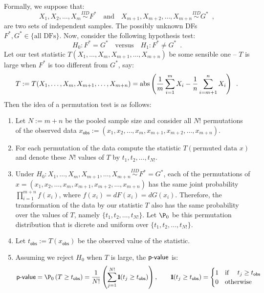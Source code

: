Formally, we suppose that:
\[
X_1,X_2,\ldots,X_m \overset{IID}{\sim} F^* \quad \text{and} \quad X_{m+1}, X_{m+2},\ldots,X_{m+n} \overset{IID}{\sim} G^* \enspace ,
\]
are two sets of independent samples.  The possibly unknown DFs $F^*,G^* \in \{ \text{all DFs} \}$.  Now, consider the following hypothesis test:
\[
H_0: F^*=G^* \quad \text{versus} \quad H_1: F^* \neq G^* \enspace .
\]
Let our test statistic $T(X_1,\ldots,X_m,X_{m+1},\ldots,X_{m+n})$ be some sensible one -- $T$ is large when $F^*$ is too different from $G^*$, say:
\[
T:=T(X_1,\ldots,X_m,X_{m+1},\ldots,X_{m+n})= \operatorname{abs} \left( \frac{1}{m} \sum_{i=1}^m X_i -  \frac{1}{n} \sum_{i=m+1}^n X_i  \right) \enspace .
\]
Then the idea of a permutation test is as follows:
\begin{enumerate}
\item Let $N:=m+n$ be the pooled sample size and consider all $N!$ permutations of the observed data $x_{\mathsf{obs}}:=(x_1,x_2,\ldots,x_m,x_{m+1},x_{m+2},\ldots,x_{m+n})$.
\item For each permutation of the data compute the statistic $T(\text{permuted data $x$})$ and denote these $N!$ values of $T$ by $t_1,t_2,\ldots,t_{N!}$.
\item Under $H_0: X_1,\ldots,X_m,X_{m+1},\ldots,X_{m+n} \overset{IID}{\sim}F^*=G^*$, each of the permutations of $x= (x_1,x_2,\ldots,x_m,x_{m+1},x_{m+2},\ldots,x_{m+n})$ has the same joint probability $\prod_{i=1}^{m+n} f(x_i)$, where $f(x_i)=dF(x_i)=dG(x_i)$.  Therefore, the transformation of the data by our statistic $T$ also has the same probability over the values of $T$, namely $\{t_1,t_2,\ldots,t_{N!}\}$.  Let $\P_0$ be this permutation distribution that is dicrete and uniform over  $\{t_1,t_2,\ldots,t_{N!}\}$.
\item Let $t_{\mathsf{obs}} := T(x_{\mathsf{obs}})$ be the observed value of the statistic.
\item Assuming we reject $H_0$ when $T$ is large, the $\mbox{\sf{p-value}}$ is:
\[
\pvalue = \P_0 \left( T \geq t_{\mathsf{obs}} \right) = \frac{1}{N!} \left( \sum_{j=1}^{N!} \BB{1} (t_j  \geq t_{\mathsf{obs}}) \right), \qquad  \BB{1} (t_j \geq t_{\mathsf{obs}}) =
\begin{cases}
1 & \text{if } \quad t_j \geq t_{\mathsf{obs}} \\
0 & \text{otherwise} 
\end{cases}
\]
\end{enumerate}

